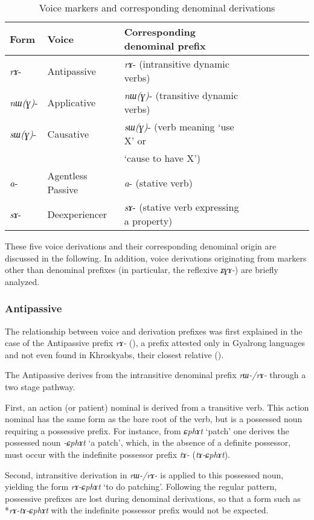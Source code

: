 \documentclass[oneside,a4paper,11pt]{article}
\newcommand{\ipa}[1]{\mbox{\phon\textit{#1}}} %
\begin{document}
\begin{table}[H] \caption{Voice markers and corresponding denominal derivations} \label{tab:denom} \centering
\begin{tabular}{lllllllll} \toprule
Form& Voice & Corresponding denominal prefix \\
\midrule
\ipa{rɤ}- & Antipassive &    \ipa{rɤ}- (intransitive dynamic verbs)\\
\ipa{nɯ(ɣ)}- & Applicative &    \ipa{nɯ(ɣ)}- (transitive dynamic verbs)\\
\ipa{sɯ(ɣ)}- & Causative &    \ipa{sɯ(ɣ)}- (verb meaning `use X' or \\
&& `cause to have X') \\
\ipa{a}- & Agentless Passive &    \ipa{a}- (stative verb)\\
\ipa{sɤ}-  & Deexperiencer &    \ipa{sɤ}- (stative verb expressing a property)\\
    \bottomrule
\end{tabular}
\end{table}

These five voice derivations and their corresponding denominal origin are discussed in the following. In addition, voice derivations originating from markers other than denominal prefixes (in particular, the reflexive \ipa{ʑɣɤ-}) are briefly analyzed.

\subsubsection{Antipassive} \label{sec:apass}
The relationship between voice and derivation prefixes was first explained in the case of the Antipassive prefix \ipa{rɤ-} (\citealt{jacques14antipassive}), a prefix attested only in Gyalrong languages and not even found in Khroskyabs, their closest relative (\citealt{lai13affixale}).


The Antipassive derives from the intransitive denominal prefix \ipa{rɯ-/rɤ-} through a two stage pathway.

First, an action (or patient) nominal is derived from a transitive verb. This action nominal has the same form as the bare root of the verb, but is a possessed noun requiring a possessive prefix. For instance, from \ipa{ɕphɤt} `patch' one derives the possessed noun 
\ipa{-ɕphɤt} `a patch', which, in the absence of a definite possessor, must occur with the indefinite possessor prefix \ipa{tɤ-} (\ipa{tɤ-ɕphɤt}).

Second, intransitive derivation in \ipa{rɯ-/rɤ-} is applied to this possessed noun, yielding the form \ipa{rɤ-ɕphɤt} `to do patching'. Following the regular pattern, possessive prefixes are lost during denominal derivations, so that a form such as *\ipa{rɤ-tɤ-ɕphɤt} with the indefinite possessor prefix would not be expected.
\end{document}
